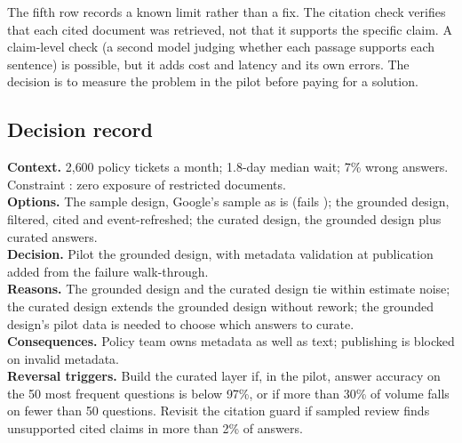 The fifth row records a known limit rather than a fix. The citation check verifies that each cited document was retrieved, not that it supports the specific claim. A claim-level check (a second model judging whether each passage supports each sentence) is possible, but it adds cost and latency and its own errors. The decision is to measure the problem in the pilot before paying for a solution.

\subsection{Decision record}

\begin{tcolorbox}[colback=white, colframe=black!45, boxrule=0.4pt, arc=1pt, fontupper=\small, title={DR-POL-001: Pilot the grounded design; curated layer as conditional phase 2}, fonttitle=\bfseries\small, coltitle=black, colbacktitle=codefill]
\textbf{Context.} 2{,}600 policy tickets a month; 1.8-day median wait; 7\% wrong answers. Constraint : zero exposure of restricted documents.\\
\textbf{Options.} The sample design, Google's sample as is (fails ); the grounded design, filtered, cited and event-refreshed; the curated design, the grounded design plus curated answers.\\
\textbf{Decision.} Pilot the grounded design, with metadata validation at publication added from the failure walk-through.\\
\textbf{Reasons.} The grounded design and the curated design tie within estimate noise; the curated design extends the grounded design without rework; the grounded design's pilot data is needed to choose which answers to curate.\\
\textbf{Consequences.} Policy team owns metadata as well as text; publishing is blocked on invalid metadata.\\
\textbf{Reversal triggers.} Build the curated layer if, in the pilot, answer accuracy on the 50 most frequent questions is below 97\%, or if more than 30\% of volume falls on fewer than 50 questions. Revisit the citation guard if sampled review finds unsupported cited claims in more than 2\% of answers.
\end{tcolorbox}
